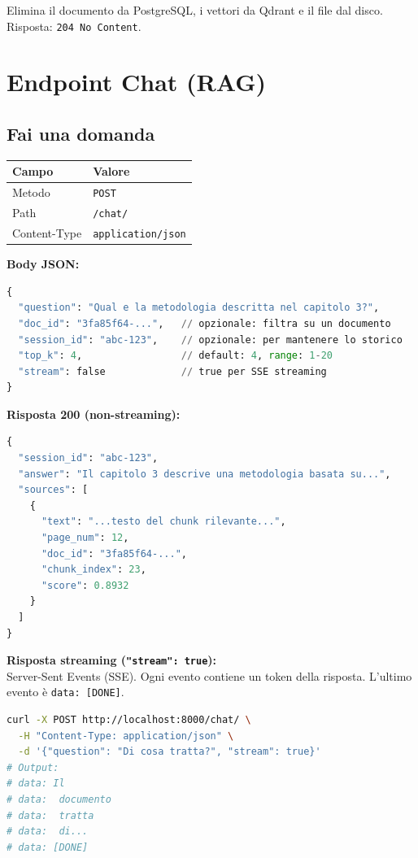 Elimina il documento da PostgreSQL, i vettori da Qdrant e il file dal disco.
Risposta: \texttt{204 No Content}.

\section{Endpoint Chat (RAG)}

\subsection{Fai una domanda}

\begin{table}[H]
  \centering
  \begin{tabularx}{\textwidth}{lX}
    \toprule
    \textbf{Campo} & \textbf{Valore} \\
    \midrule
    Metodo      & \texttt{POST} \\
    Path        & \texttt{/chat/} \\
    Content-Type & \texttt{application/json} \\
    \bottomrule
  \end{tabularx}
\end{table}

\textbf{Body JSON:}
\begin{lstlisting}[language=Python]
{
  "question": "Qual e la metodologia descritta nel capitolo 3?",
  "doc_id": "3fa85f64-...",   // opzionale: filtra su un documento
  "session_id": "abc-123",    // opzionale: per mantenere lo storico
  "top_k": 4,                 // default: 4, range: 1-20
  "stream": false             // true per SSE streaming
}
\end{lstlisting}

\textbf{Risposta 200 (non-streaming):}
\begin{lstlisting}[language=Python]
{
  "session_id": "abc-123",
  "answer": "Il capitolo 3 descrive una metodologia basata su...",
  "sources": [
    {
      "text": "...testo del chunk rilevante...",
      "page_num": 12,
      "doc_id": "3fa85f64-...",
      "chunk_index": 23,
      "score": 0.8932
    }
  ]
}
\end{lstlisting}

\textbf{Risposta streaming (\texttt{"stream": true}):}\\
Server-Sent Events (SSE). Ogni evento contiene un token della risposta.
L'ultimo evento è \texttt{data: [DONE]}.

\begin{lstlisting}[language=bash]
curl -X POST http://localhost:8000/chat/ \
  -H "Content-Type: application/json" \
  -d '{"question": "Di cosa tratta?", "stream": true}'
# Output:
# data: Il
# data:  documento
# data:  tratta
# data:  di...
# data: [DONE]
\end{lstlisting}

